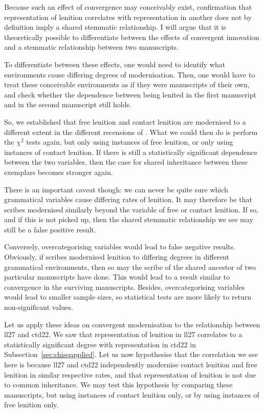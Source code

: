 Because such an effect of convergence may conceivably exist, confirmation that representation of lenition  correlates with representation in another does not by definition imply a shared stemmatic relationship. I will argue that it is theoretically possible to differentiate between the effects of convergent innovation and a stemmatic relationship between two manuscripts.

To differentiate between these effects, one would need to identify what environments cause differing degrees of modernisation. Then, one would have to treat these conceivable environments as if they were manuscripts of their own, and check whether the dependence between being lenited in the first manuscript and in the second manuscript still holds.

So, we established that free lenition and contact lenition are modernised to a different extent in the different recensions of . What we could then do is perform the \(\chi^2\) tests again, but only using instances of free lenition, or only using instances of contact lenition. If there is still a statistically significant dependence between the two variables, then the case for shared inheritance between these exemplars becomes stronger again.

There is an important caveat though: we can never be quite sure which grammatical variables cause differing rates of lenition. It may therefore be that scribes modernised similarly beyond the variable of free or contact lenition. If so, and if this is not picked up, then the shared stemmatic relationship we see may still be a false positive result.

Conversely, overcategorising variables would lead to false negative results. Obviously, if scribes modernised lenition to differing degrees in different grammatical environments, then so may the scribe of the shared ancestor of two particular manuscripts have done. This would lead to a result similar to convergence in the surviving manuscripts. Besides, overcategorising variables would lead to smaller sample sizes, so statistical tests are more likely to return non-significant values.

Let us apply these ideas on convergent modernisation to the relationship between \gls{ll27} and \gls{ctd22}. We saw that representation of lenition in \gls{ll27} correlates to a statistically significant degree with representation in \gls{ctd22} in Subsection~\ref{sec:chisqapplied}. Let us now hypothesise that the correlation we see here is because \gls{ll27} and \gls{ctd22} independently modernise contact lenition and free lenition in similar respective rates, and that representation of lenition is not due to common inheritance. We may test this hypothesis by comparing these manuscripts, but using instances of contact lenition only, or by using instances of free lenition only. 


